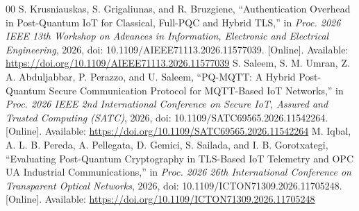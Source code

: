 \documentclass[journal, 10pt]{IEEEtran}
\begin{document}
\begin{thebibliography}{00}
 S. Krusniauskas, S. Grigaliunas, and R. Bruzgiene, ``Authentication Overhead in Post-Quantum IoT for Classical, Full-PQC and Hybrid TLS,'' in \textit{Proc. 2026 IEEE 13th Workshop on Advances in Information, Electronic and Electrical Engineering}, 2026, doi: 10.1109/AIEEE71113.2026.11577039. [Online]. Available: \url{https://doi.org/10.1109/AIEEE71113.2026.11577039}
 S. Saleem, S. M. Umran, Z. A. Abduljabbar, P. Perazzo, and U. Saleem, ``PQ-MQTT: A Hybrid Post-Quantum Secure Communication Protocol for MQTT-Based IoT Networks,'' in \textit{Proc. 2026 IEEE 2nd International Conference on Secure IoT, Assured and Trusted Computing (SATC)}, 2026, doi: 10.1109/SATC69565.2026.11542264. [Online]. Available: \url{https://doi.org/10.1109/SATC69565.2026.11542264}
 M. Iqbal, A. L. B. Pereda, A. Pellegata, D. Gemici, S. Sailada, and I. B. Gorotxategi, ``Evaluating Post-Quantum Cryptography in TLS-Based IoT Telemetry and OPC UA Industrial Communications,'' in \textit{Proc. 2026 26th International Conference on Transparent Optical Networks}, 2026, doi: 10.1109/ICTON71309.2026.11705248. [Online]. Available: \url{https://doi.org/10.1109/ICTON71309.2026.11705248}
\end{thebibliography}
\end{document}
